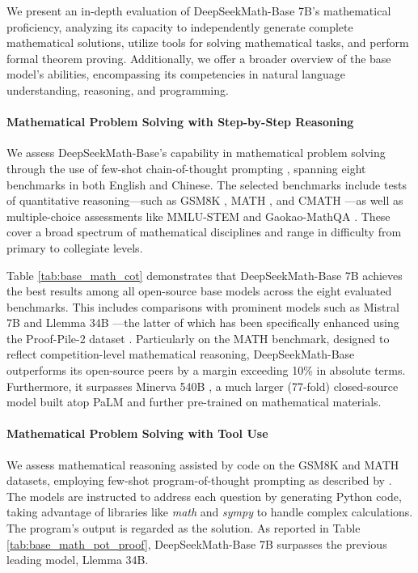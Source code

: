 \begin{itemize}[topsep=0pt]
We present an in-depth evaluation of DeepSeekMath-Base 7B's mathematical proficiency, analyzing its capacity to independently generate complete mathematical solutions, utilize tools for solving mathematical tasks, and perform formal theorem proving. Additionally, we offer a broader overview of the base model's abilities, encompassing its competencies in natural language understanding, reasoning, and programming.

\paragraph{Mathematical Problem Solving with Step-by-Step Reasoning}

We assess DeepSeekMath-Base’s capability in mathematical problem solving through the use of few-shot chain-of-thought prompting \citep{cot}, spanning eight benchmarks in both English and Chinese. The selected benchmarks include tests of quantitative reasoning—such as GSM8K \citep{gsm8k}, MATH \citep{MATH}, and CMATH \citep{wei2023cmath}—as well as multiple-choice assessments like MMLU-STEM \citep{mmlu} and Gaokao-MathQA \citep{agieval}. These cover a broad spectrum of mathematical disciplines and range in difficulty from primary to collegiate levels.

Table \ref{tab:base_math_cot} demonstrates that DeepSeekMath-Base 7B achieves the best results among all open-source base models across the eight evaluated benchmarks. This includes comparisons with prominent models such as Mistral 7B \citep{mistral} and Llemma 34B \citep{llemma}—the latter of which has been specifically enhanced using the Proof-Pile-2 dataset \citep{llemma}. Particularly on the MATH benchmark, designed to reflect competition-level mathematical reasoning, DeepSeekMath-Base outperforms its open-source peers by a margin exceeding 10\% in absolute terms. Furthermore, it surpasses Minerva 540B \citep{minerva}, a much larger (77-fold) closed-source model built atop PaLM \citep{palm} and further pre-trained on mathematical materials.

\paragraph{Mathematical Problem Solving with Tool Use} We assess mathematical reasoning assisted by code on the GSM8K and MATH datasets, employing few-shot program-of-thought prompting as described by \citet{pot,pal}. The models are instructed to address each question by generating Python code, taking advantage of libraries like \textit{math} and \textit{sympy} to handle complex calculations. The program’s output is regarded as the solution. As reported in Table \ref{tab:base_math_pot_proof}, DeepSeekMath-Base 7B surpasses the previous leading model, Llemma 34B.


\end{itemize}
